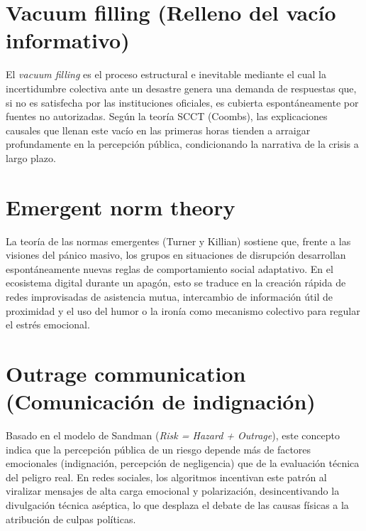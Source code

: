 \section{Vacuum filling (Relleno del vacío informativo)}
\label{anexo:vacuum_filling}
El \textit{vacuum filling} es el proceso estructural e inevitable mediante el cual la incertidumbre colectiva ante un desastre genera una demanda de respuestas que, si no es satisfecha por las instituciones oficiales, es cubierta espontáneamente por fuentes no autorizadas. Según la teoría SCCT (Coombs), las explicaciones causales que llenan este vacío en las primeras horas tienden a arraigar profundamente en la percepción pública, condicionando la narrativa de la crisis a largo plazo.

\section{Emergent norm theory}
\label{anexo:emergent_norm}
La teoría de las normas emergentes (Turner y Killian) sostiene que, frente a las visiones del pánico masivo, los grupos en situaciones de disrupción desarrollan espontáneamente nuevas reglas de comportamiento social adaptativo. En el ecosistema digital durante un apagón, esto se traduce en la creación rápida de redes improvisadas de asistencia mutua, intercambio de información útil de proximidad y el uso del humor o la ironía como mecanismo colectivo para regular el estrés emocional.

\section{Outrage communication (Comunicación de indignación)}
\label{anexo:outrage_comm}
Basado en el modelo de Sandman (\textit{Risk = Hazard + Outrage}), este concepto indica que la percepción pública de un riesgo depende más de factores emocionales (indignación, percepción de negligencia) que de la evaluación técnica del peligro real. En redes sociales, los algoritmos incentivan este patrón al viralizar mensajes de alta carga emocional y polarización, desincentivando la divulgación técnica aséptica, lo que desplaza el debate de las causas físicas a la atribución de culpas políticas.